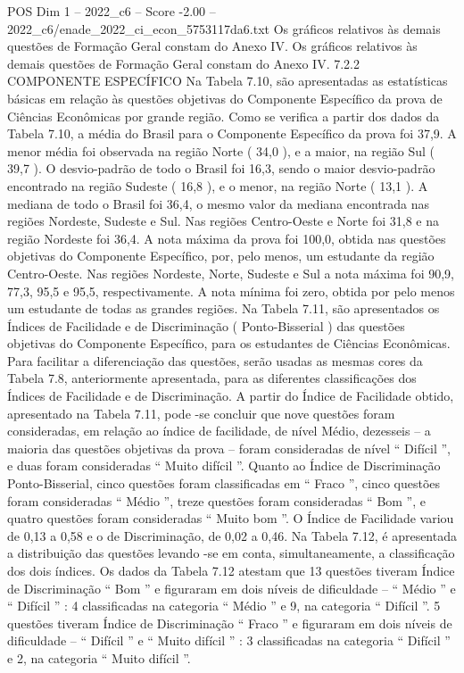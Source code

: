 \begin{textsample}{POS Dim 1 – 2022\_c6 – Score -2.00 – 2022\_c6/enade\_2022\_ci\_econ\_5753117da6.txt}
Os gráficos relativos às demais questões de Formação Geral constam do Anexo IV.
Os gráficos relativos às demais questões de Formação Geral constam do Anexo IV. 7.2.2 COMPONENTE ESPECÍFICO Na Tabela 7.10, são apresentadas as estatísticas básicas em relação às questões objetivas do Componente Específico da prova de Ciências Econômicas por grande região.
Como se verifica a partir dos dados da Tabela 7.10, a média do Brasil para o Componente Específico da prova foi 37,9.
A menor média foi observada na região Norte ( 34,0 ), e a maior, na região Sul ( 39,7 ).
O desvio-padrão de todo o Brasil foi 16,3, sendo o maior desvio-padrão encontrado na região Sudeste ( 16,8 ), e o menor, na região Norte ( 13,1 ).
A mediana de todo o Brasil foi 36,4, o mesmo valor da mediana encontrada nas regiões Nordeste, Sudeste e Sul.
Nas regiões Centro-Oeste e Norte foi 31,8 e na região Nordeste foi 36,4.
A nota máxima da prova foi 100,0, obtida nas questões objetivas do Componente Específico, por, pelo menos, um estudante da região Centro-Oeste.
Nas regiões Nordeste, Norte, Sudeste e Sul a nota máxima foi 90,9, 77,3, 95,5 e 95,5, respectivamente.
A nota mínima foi zero, obtida por pelo menos um estudante de todas as grandes regiões.
Na Tabela 7.11, são apresentados os Índices de Facilidade e de Discriminação ( Ponto-Bisserial ) das questões objetivas do Componente Específico, para os estudantes de Ciências Econômicas.
Para facilitar a diferenciação das questões, serão usadas as mesmas cores da Tabela 7.8, anteriormente apresentada, para as diferentes classificações dos Índices de Facilidade e de Discriminação.
A partir do Índice de Facilidade obtido, apresentado na Tabela 7.11, pode -se concluir que nove questões foram consideradas, em relação ao índice de facilidade, de nível Médio, dezesseis – a maioria das questões objetivas da prova – foram consideradas de nível “ Difícil ”, e duas foram consideradas “ Muito difícil ”.
Quanto ao Índice de Discriminação Ponto-Bisserial, cinco questões foram classificadas em “ Fraco ”, cinco questões foram consideradas “ Médio ”, treze questões foram consideradas “ Bom ”, e quatro questões foram consideradas “ Muito bom ”.
O Índice de Facilidade variou de 0,13 a 0,58 e o de Discriminação, de 0,02 a 0,46.
Na Tabela 7.12, é apresentada a distribuição das questões levando -se em conta, simultaneamente, a classificação dos dois índices.
Os dados da Tabela 7.12 atestam que 13 questões tiveram Índice de Discriminação “ Bom ” e figuraram em dois níveis de dificuldade – “ Médio ” e “ Difícil ” : 4 classificadas na categoria “ Médio ” e 9, na categoria “ Difícil ”. 5 questões tiveram Índice de Discriminação “ Fraco ” e figuraram em dois níveis de dificuldade – “ Difícil ” e “ Muito difícil ” : 3 classificadas na categoria “ Difícil ” e 2, na categoria “ Muito difícil ”.

\end{textsample}
